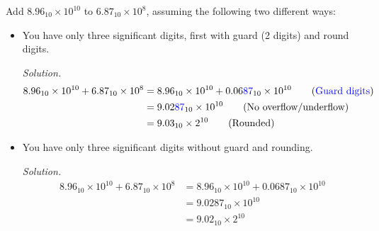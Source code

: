 \documentclass[12pt]{article}
\newenvironment{problem}[2][Problem]{\begin{trivlist}
\item[\hskip \labelsep {\bfseries #1}\hskip \labelsep {\bfseries
#2.}]}{\end{trivlist}}
\begin{document}
\begin{problem}{10}
Add $8.96_{10} \times 10^{10}$ to $6.87_{10} \times 10^8$,  assuming the following two different ways:

\begin{itemize}
    \item[(a)]  You have only three significant digits, first with guard (2 digits) and round digits.
    
    \textit{Solution.}
    \begin{align*}
    8.96_{10} \times 10^{10} + 6.87_{10} \times 10^8 &= 8.96_{10} \times 10^{10} + 0.06\textcolor{blue}{87}_{10} \times 10^{10} \tag*{(\textcolor{blue}{Guard digits})} \\
    &= 9.02\textcolor{blue}{87}_{10} \times 10^{10} \tag*{(No overflow/underflow)} \\ 
    &= 9.03_{10} \times 2^{10} \tag*{(Rounded)}
\end{align*}
    
    \item[(b)] You have only three significant digits without guard and rounding.
    
        \textit{Solution.}
    \begin{align*}
    8.96_{10} \times 10^{10} + 6.87_{10} \times 10^8 &= 8.96_{10} \times 10^{10} + 0.0687_{10} \times 10^{10} \\
    &= 9.0287_{10} \times 10^{10} \tag*{(No overflow/underflow)} \\ 
    &= 9.02_{10} \times 2^{10} \tag*{(Truncated)}
\end{align*}
\end{itemize}
\end{problem}
\end{document}
